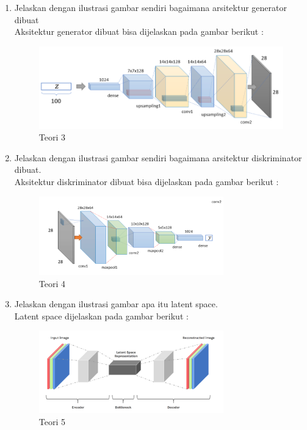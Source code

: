 \begin{enumerate}
\item Jelaskan dengan ilustrasi gambar sendiri bagaimana arsitektur generator dibuat
	\hfill\\
	Aksitektur generator dibuat bisa dijelaskan pada gambar berikut : 

\begin{figure}[H]
    \includegraphics[width=12cm]{figures/1174076/figures8/teori3.png}
    \centering
    \caption{Teori 3}
\end{figure}

\item Jelaskan dengan ilustrasi gambar sendiri bagaimana arsitektur diskriminator dibuat.
\hfill\\
	Aksitektur diskriminator dibuat bisa dijelaskan pada gambar berikut : 
	
\begin{figure}[H]
    \includegraphics[width=8cm]{figures/1174076/figures8/teori4.png}
    \centering
    \caption{Teori 4}
\end{figure}

\item Jelaskan dengan ilustrasi gambar apa itu latent space.
	\hfill\\
	Latent space dijelaskan pada gambar berikut :

\begin{figure}[H]
    \includegraphics[width=8cm]{figures/1174076/figures8/teori5.png}
    \centering
    \caption{Teori 5}
\end{figure}


\end{enumerate}
